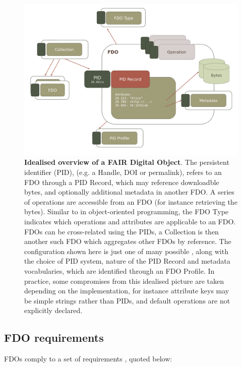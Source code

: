 \begin{figure}[hbt]
  \includegraphics[width=\textwidth]{figures/ch03/fdo.pdf}
    \caption[Idealised overview of a FAIR Digital Object]{\textbf{Idealised overview of a FAIR Digital Object}. The persistent identifier (PID), (e.g. a Handle, DOI or permalink), refers to an FDO through a PID Record, which may reference downloadble bytes, and optionally additional metadata in another FDO. A series of operations are accessible from an FDO (for instance retrieving the bytes). Similar to in object-oriented programming, the FDO Type indicates which operations and attributes are applicable to an FDO. FDOs can be cross-related using the PIDs, a Collection is then another such FDO which aggregates other FDOs by reference. The configuration shown here is just one of many possible \cite{Lannom 2022a}, along with the choice of PID system, nature of the PID Record and metadata vocabularies, which are identified through an FDO Profile. In practice, some compromises from this idealised picture are taken depending on the implementation, for instance attribute keys may be simple strings rather than PIDs, and default operations are not explicitly declared.
    }
  \label{ch3:fig:fdo}
\end{figure}

\subsection{FDO requirements}\label{ch3:fdo-requirements}

FDOs comply to a set of requirements \cite{Anders 2023}, quoted below:

